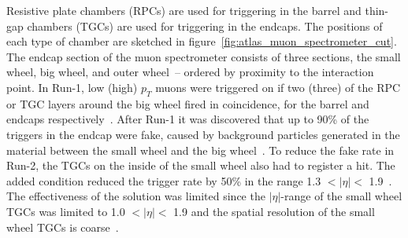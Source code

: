 Resistive plate chambers (RPCs) are used for triggering in the barrel and thin-gap chambers (TGCs) are used for triggering in the endcaps. The positions of each type of chamber are sketched in figure~\ref{fig:atlas_muon_spectrometer_cut}. The endcap section of the muon spectrometer consists of three sections, the small wheel, big wheel, and outer wheel~-- ordered by proximity to the interaction point. In Run-1, low (high) $p_T$ muons were triggered on if two (three) of the RPC or TGC layers around the big wheel fired in coincidence, for the barrel and endcaps respectively~\cite{atlas_l1_trigger_tdr}. After Run-1 it was discovered that up to 90\% of the triggers in the endcap were fake, caused by background particles generated in the material between the small wheel and the big wheel~\cite{nsw_tdr}.  To reduce the fake rate in Run-2, the TGCs on the inside of the small wheel also had to register a hit. The added condition reduced the trigger rate by 50\% in the range 1.3 $< |\eta| <$ 1.9~\cite{martinez_run-2_2016}. The effectiveness of the solution was limited since the $|\eta|$-range of the small wheel TGCs was limited to 1.0 $< |\eta| <$ 1.9 and the spatial resolution of the small wheel TGCs is coarse~\cite{nsw_tdr}.


